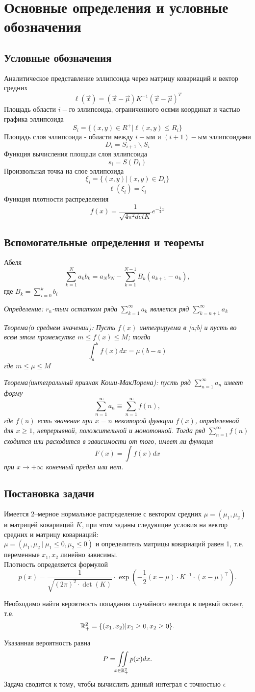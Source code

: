 \section{Основные определения и условные обозначения}
\subsection{Условные обозначения}
Аналитическое представление эллипсоида через матрицу ковариаций и вектор средних
$$\ell(\vec x)=(\vec x-\vec \mu)K^{-1}(\vec x-\vec \mu)^T$$
Площадь области $i-$го эллипсоида, ограниченного осями координат и частью графика эллипсоида
$$S_i = \{(x,y) \in R^{+}|\ell(x,y)\le R_i\}$$
Площадь слоя эллипсоида - области между $i-$ым и $(i+1)-$ым эллипсоидами
$$D_i = S_{i+1}\backslash S_i$$
Функция вычисления площади слоя эллипсоида
$$s_i = S(D_i)$$
Произвольная точка на слое эллипсоида
$$\xi_i=\{(x,y)|(x,y)\in D_i\}$$
$$\ell(\xi_i) = \zeta_i$$
Функция плотности распределения
$$f(x) = \frac{1}{\sqrt{4\pi^2detK}}e^{-\frac{1}{2}x}$$
\subsection{Вспомогательные определения и теоремы}
 Абеля
$$\sum_{k=1}^{N}a_kb_k = a_Nb_N-\sum_{k=1}^{N-1}B_k(a_{k+1}-a_k),$$
где $B_k = \sum_{i=0}^kb_i$
\par{\it Определение: $r_n$-тым остатком ряда $\sum_{k=1}^\infty a_k$ является ряд $\sum_{k=n+1}^\infty a_k$}
\par{\it Теорема(о среднем значении): Пусть $f(x)$ интегрируема в [a;b] и пусть во всем этом промежутке $m\le f(x)\le M$; тогда}
$$\int_a^b{f(x)dx = \mu(b - a)}$$
{\it где $m\le \mu\le M$}
\par{\it Теорема(интегральный признак Коши-МакЛорена): пусть ряд $\sum_{n=1}^\infty{a_n}$ имеет форму $$\sum_{n=1}^\infty{a_n}\equiv\sum_{n=1}^\infty{f(n)},$$ где $f(n)$ есть значение при $x=n$ некоторой функции $f(x)$, определенной для $x\ge 1$, непрерывной, положительной и монотонной. Тогда ряд $\sum_{n=1}^\infty{f(n)}$ сходится или расходится в зависимости от того, имеет ли функция $$F(x)=\int{f(x)dx}$$при $x\rightarrow+\infty$ конечный предел или нет.}
\subsection{Постановка задачи}

Имеется $2$--мерное нормальное распределение с вектором средних $\mu= (\mu_1,\mu_2)$
и матрицей ковариаций $K$, при этом заданы следующие условия на вектор средних и матрицу ковариаций:\\
$\mu = {(\mu_1,\mu_2\ |\ \mu_1 \le 0,\mu_2 \le 0)}$ и определитель матрицы ковариаций равен 1, т.е. переменные $x_1,x_2$ линейно зависимы.\\
Плотность определяется формулой 
$$p(x) = \frac{1}{\sqrt{(2\pi)^2\cdot \det(K)}}\cdot \exp(-\frac12
(x-\mu)\cdot K^{-1}\cdot(x-\mu)^\top).$$

Необходимо найти вероятность попадания случайного вектора в первый октант, т.е.
$${\mathbb{R}}^2_+ = \{ (x_1,x_2) | x_1\ge0,x_2\ge0\}.$$

Указанная вероятность равна $$P = \iint\limits_{x\in{\mathbb{R}}^2_+}p(x)dx.$$
Задача сводится к тому, чтобы вычислить данный интеграл с точностью $\epsilon$
